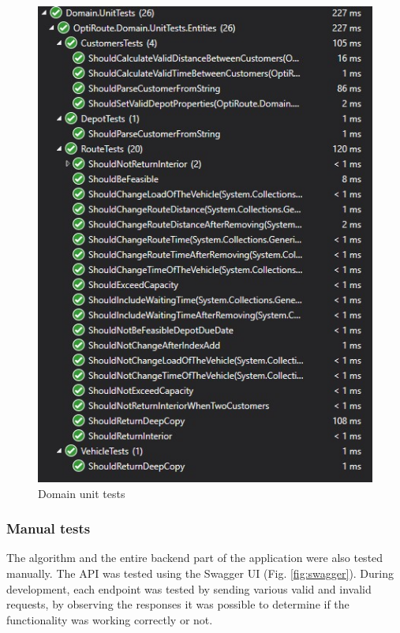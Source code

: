 \documentclass[a4paper,twoside,12pt]{book}
\begin{document}
\begin{figure}
\centering
\includegraphics[width=\textwidth]{images/domainTests.jpg}
\caption{Domain unit tests}
\label{fig:unitTestsRun}
\end{figure}

\subsubsection{Manual tests}
The algorithm and the entire backend part of the application were also tested manually. The API was tested using the Swagger UI (Fig. \ref{fig:swagger}). During development, each endpoint was tested by sending various valid and invalid requests, by observing the responses it was possible to determine if the functionality was working correctly or not. 
\end{document}

